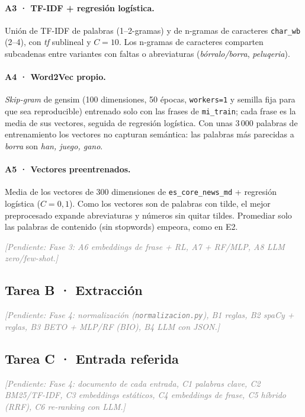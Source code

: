 \documentclass[10pt,a4paper]{article}
\newcommand{\cod}[1]{\texttt{#1}}
\newcommand{\pendiente}[1]{\textcolor{gray}{\textit{[Pendiente: #1]}}}
\begin{document}
\paragraph{A3 · TF-IDF + regresión logística.} Unión de TF-IDF de palabras (1--2-gramas) y de n-gramas de caracteres \cod{char\_wb} (2--4), con \textit{tf} sublineal y $C=10$. Los n-gramas de caracteres comparten subcadenas entre variantes con faltas o abreviaturas (\textit{bórralo/borra}, \textit{peluqeria}).

\paragraph{A4 · Word2Vec propio.} \textit{Skip-gram} de gensim (100 dimensiones, 50 épocas, \cod{workers=1} y semilla fija para que sea reproducible) entrenado solo con las frases de \cod{mi\_train}; cada frase es la media de sus vectores, seguida de regresión logística. Con unas 3\,000 palabras de entrenamiento los vectores no capturan semántica: las palabras más parecidas a \textit{borra} son \textit{han, juego, gano}.

\paragraph{A5 · Vectores preentrenados.} Media de los vectores de 300 dimensiones de \cod{es\_core\_news\_md} + regresión logística ($C=0{,}1$). Como los vectores son de palabras con tilde, el mejor preprocesado expande abreviaturas y números sin quitar tildes. Promediar solo las palabras de contenido (sin stopwords) empeora, como en E2.

\pendiente{Fase 3: A6 embeddings de frase + RL, A7 + RF/MLP, A8 LLM zero/few-shot.}

\subsection{Tarea B · Extracción}
\pendiente{Fase 4: normalización (\cod{normalizacion.py}), B1 reglas, B2 spaCy + reglas, B3 BETO + MLP/RF (BIO), B4 LLM con JSON.}

\subsection{Tarea C · Entrada referida}
\pendiente{Fase 4: documento de cada entrada, C1 palabras clave, C2 BM25/TF-IDF, C3 embeddings estáticos, C4 embeddings de frase, C5 híbrido (RRF), C6 re-ranking con LLM.}

\end{document}
